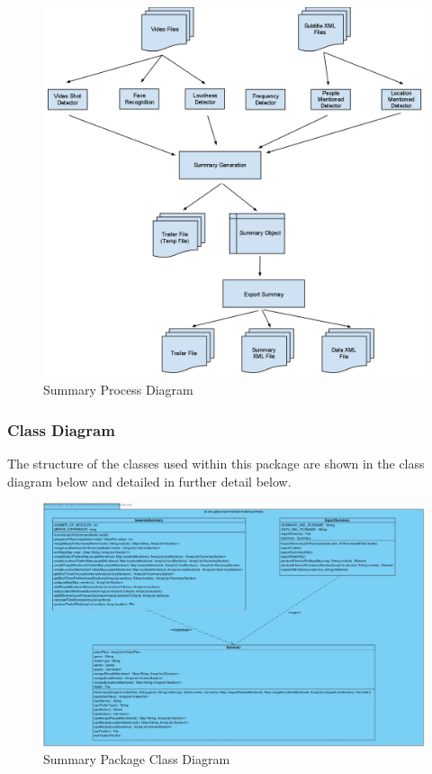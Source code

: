 \begin{figure}[h1]
\begin{center}
 \includegraphics[trim = 0mm 0mm 0mm 0mm, clip,
 scale=0.2]{Images/SummaryProductionProcess.png}
  \caption{Summary Process Diagram}
 \end{center}
\end{figure}

\newpage
\subsubsection{Class Diagram}
The structure of the classes used within this package are shown in the class diagram below and detailed in further detail below.

\begin{figure}[ht]
\begin{center}
 \includegraphics[trim = 0mm 0mm 0mm 0mm, clip,
 scale=0.33]{Images/summary_package_class_diagram.jpg}
  \caption{Summary Package Class Diagram}
 \end{center}
\end{figure}

